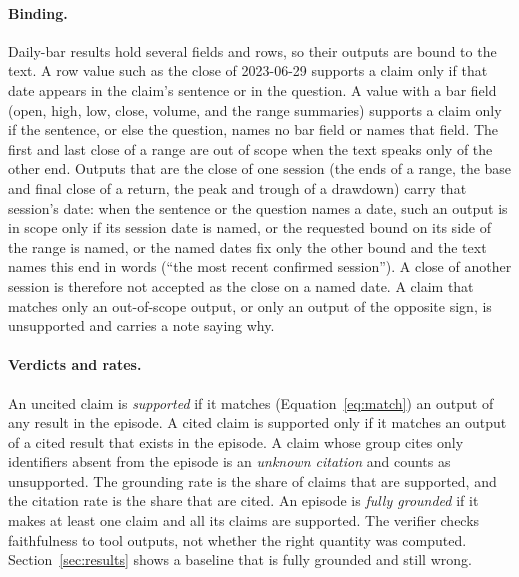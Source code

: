\paragraph{Binding.} Daily-bar results hold several fields and rows, so their
outputs are bound to the text. A row value such as the close of 2023-06-29
supports a claim only if that date appears in the claim's sentence or in the
question. A value with a bar field (open, high, low, close, volume, and the
range summaries) supports a claim only if the sentence, or else the question,
names no bar field or names that field. The first and last close of a range
are out of scope when the text speaks only of the other end. Outputs that are
the close of one session (the ends of a range, the base and final close of a
return, the peak and trough of a drawdown) carry that session's date: when
the sentence or the question names a date, such an output is in scope only if
its session date is named, or the requested bound on its side of the range is
named, or the named dates fix only the other bound and the text names this
end in words (``the most recent confirmed session''). A close of another
session is therefore not accepted as the close on a named date. A claim that
matches only an out-of-scope output, or only an output of the opposite sign,
is unsupported and carries a note saying why.

\paragraph{Verdicts and rates.} An uncited claim is \emph{supported} if it
matches (Equation~\ref{eq:match}) an output of any result in the episode. A cited claim is supported
only if it matches an output of a cited result that exists in the episode. A
claim whose group cites only identifiers absent from the episode is an
\emph{unknown citation} and counts as unsupported. The grounding rate is the
share of claims that are supported, and the citation rate is the share that
are cited. An episode is \emph{fully grounded} if it makes at least one claim
and all its claims are supported. The verifier checks faithfulness to tool
outputs, not whether the right quantity was computed. Section~\ref{sec:results}
shows a baseline that is fully grounded and still wrong.
